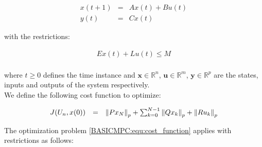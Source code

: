 	    \begin{equation}
        \begin{array}{rcl}
            x(t+1)&=&Ax(t)+Bu(t)\\
						y(t)&=&Cx(t)
        \end{array}
        \label{BASICMPC:equ:basic_LTI}
    \end{equation}
		
	with the restrictions:
	
	\begin{equation}
        \begin{array}{rcl}
            Ex(t)+Lu(t)\leq M\\
        \end{array}
        \label{BASICMPC:equ:restrict_LTI}
    \end{equation}
		
		where $t\geq0$ defines the time instance and $\textbf{x}\in \mathbb{R}^n$, $\textbf{u}\in \mathbb{R}^m$, $\textbf{y}\in \mathbb{R}^p$ are the states, inputs and outputs of the system respectively. \\
	 We define the following cost function to optimize:
		
		\begin{equation}
        \begin{array}{rcl}
         J(U_n,x(0))&=&\left\lVert{Px_N}\right\rVert_p+\sum^{N-1}_{k=0}\left\lVert Qx_k\right\rVert_p+\left\lVert Ru_k\right\rVert_p\\
        \end{array}
        \label{BASICMPC:equ:cost_function}
    \end{equation}
		
		The optimization problem \ref{BASICMPC:equ:cost_function} applies with restrictions as follows:
		
